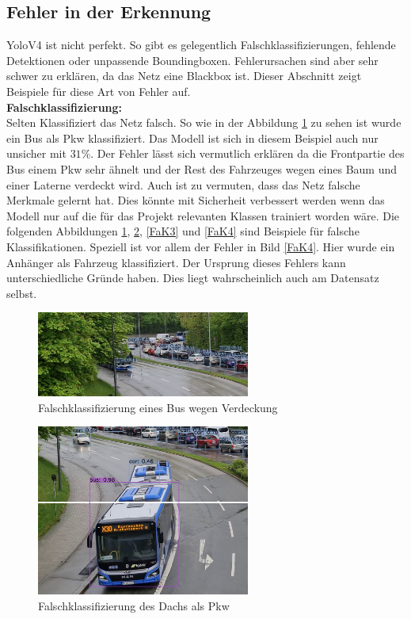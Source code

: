\documentclass[conference]{IEEEtran}
\begin{document}
	\subsection{Fehler in der Erkennung}
	YoloV4 ist nicht perfekt. So gibt es gelegentlich Falschklassifizierungen, fehlende Detektionen oder unpassende Boundingboxen.  Fehlerursachen sind aber sehr schwer zu erklären, da das Netz eine Blackbox ist. Dieser Abschnitt zeigt Beispiele für diese Art von Fehler auf.\\
	\textbf{Falschklassifizierung:}\\
	Selten Klassifiziert das Netz falsch. So wie in der Abbildung \ref{FaK} zu sehen ist wurde ein Bus als Pkw klassifiziert. Das Modell ist sich in diesem Beispiel auch nur unsicher mit $31\%$. Der Fehler lässt sich vermutlich erklären da die Frontpartie des Bus einem Pkw sehr ähnelt und der Rest des Fahrzeuges wegen eines Baum und einer Laterne verdeckt wird. Auch ist zu vermuten, dass das Netz falsche Merkmale gelernt hat. Dies könnte mit Sicherheit verbessert werden wenn das Modell nur auf die für das Projekt relevanten Klassen trainiert worden wäre. Die folgenden Abbildungen \ref{FaK}, \ref{FaK2}, \ref{FaK3} und \ref{FaK4} sind Beispiele für falsche Klassifikationen. Speziell ist vor allem der Fehler in Bild \ref{FaK4}. Hier wurde ein Anhänger als Fahrzeug klassifiziert. Der Ursprung dieses Fehlers kann unterschiedliche Gründe haben. Dies liegt wahrscheinlich auch am Datensatz selbst.
	\begin{figure}[!h]
		\begin{center}
			\includegraphics[width=7cm]{Media/Output_480 - Kopie.jpg}
			\caption{Falschklassifizierung eines Bus wegen Verdeckung}
			\label{FaK}
		\end{center}
	\end{figure}
	\begin{figure}[!h]
		\begin{center}
			\includegraphics[width=7cm]{Media/Output_847 - Kopie.jpg}
			\caption{Falschklassifizierung des Dachs als Pkw}
			\label{FaK2}
		\end{center}
	\end{figure}
\end{document}
